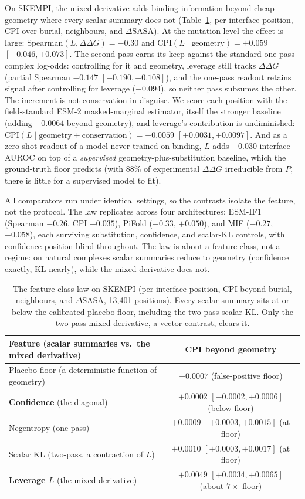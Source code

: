 \documentclass{article} %
\begin{document}
On SKEMPI, the mixed derivative adds binding information beyond cheap geometry where every scalar summary does
not (Table~\ref{tab:featureclass}, per interface position, CPI over burial, neighbours, and $\Delta$SASA). At the
mutation level the effect is large: Spearman$(L, \Delta\Delta G) = -0.30$ and CPI$(L \mid \text{geometry}) = +0.059$
$[+0.046, +0.073]$. The second pass earns its keep against the standard one-pass complex log-odds: controlling for
it and geometry, leverage still tracks $\Delta\Delta G$ (partial Spearman $-0.147$ $[-0.190, -0.108]$), and the
one-pass readout retains signal after controlling for leverage ($-0.094$), so neither pass subsumes the other.
The increment is not conservation in disguise. We score each position with the field-standard ESM-2
\citep{lin2023esm2} masked-marginal estimator, itself the stronger baseline (adding $+0.0064$ beyond geometry), and
leverage's contribution is undiminished: CPI$(L \mid \text{geometry} + \text{conservation}) = +0.0059$ $[+0.0031,
+0.0097]$. And as a
zero-shot readout of a model never trained on binding, $L$ adds $+0.030$ interface AUROC on top of a
\emph{supervised} geometry-plus-substitution baseline, which the ground-truth floor predicts (with 88\% of
experimental $\Delta\Delta G$ irreducible from $P$, there is little for a supervised model to fit).

All comparators run under identical settings, so the contrasts isolate the feature, not the protocol. The law
replicates across four architectures: ESM-IF1 (Spearman $-0.26$, CPI $+0.035$), PiFold ($-0.33$, $+0.050$), and MIF
($-0.27$, $+0.058$), each surviving substitution, confidence, and scalar-KL controls, with confidence
position-blind throughout. The law is about a feature class, not a regime: on natural complexes scalar summaries
reduce to geometry (confidence exactly, KL nearly), while the mixed derivative does not.

\begin{table}[t]
\centering
\caption{The feature-class law on SKEMPI (per interface position, CPI beyond burial, neighbours, and
$\Delta$SASA, 13{,}401 positions). Every scalar summary sits at or below the calibrated placebo floor, including
the two-pass scalar KL. Only the two-pass mixed derivative, a vector contrast, clears it.}
\label{tab:featureclass}
\small
\begin{tabular}{lc}
\hline
Feature (scalar summaries vs.\ the mixed derivative) & CPI beyond geometry \\
\hline
Placebo floor (a deterministic function of geometry) & $+0.0007$ (false-positive floor) \\
\textbf{Confidence} (the diagonal) & $+0.0002$ $[-0.0002, +0.0006]$ (below floor) \\
Negentropy (one-pass) & $+0.0009$ $[+0.0003, +0.0015]$ (at floor) \\
Scalar KL (two-pass, a contraction of $L$) & $+0.0010$ $[+0.0003, +0.0017]$ (at floor) \\
\textbf{Leverage $L$} (the mixed derivative) & $\mathbf{+0.0049}$ $[+0.0034, +0.0065]$ (about $7\times$ floor) \\
\hline
\end{tabular}
\end{table}
\end{document}
